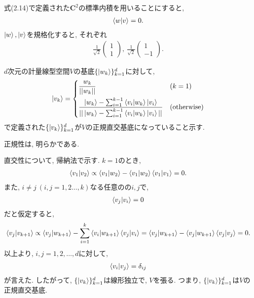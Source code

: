 \begin{ex}
    \label{ex2.7}
    式(2.14)で定義された$\bm{C}^2$の標準内積を用いることにすると,
    \begin{align*}
        \braket{w|v}=0.
    \end{align*}
    $\ket{w},\ket{v}$を規格化すると, それぞれ
    \begin{align*}
        \frac{1}{\sqrt{2}}
        \begin{pmatrix}
            1 \\ 1
        \end{pmatrix}
        ,\
        \frac{1}{\sqrt{2}}
        \begin{pmatrix}
            1 \\ -1
        \end{pmatrix}.
    \end{align*}
\end{ex}

\begin{ex}
    \label{ex2.8}
    $d$次元の計量線型空間$V$の基底$\{\ket{w_k}\}_{k=1}^d$に対して,
    \begin{align*}
        \ket{v_{k}}
        =
        \begin{dcases}
            \frac{w_{k}}{||w_{k}||} & (k=1)                \\
            \frac{
            \ket{w_{k}}-\sum_{i=1}^{k-1}\braket{v_i|w_{k}} \ket{v_i}
            }{
            ||\ket{w_{k}}-\sum_{i=1}^{k-1}\braket{v_i|w_{k}} \ket{v_i}||
            }                       & (\mathrm{otherwise})
        \end{dcases}
    \end{align*}
    で定義された$\{\ket{v_k}\}_{k=1}^d$が$V$の正規直交基底になっていること示す.
    \par
    正規性は, 明らかである.
    \par
    直交性について, 帰納法で示す.
    $k=1$のとき,
    \begin{align*}
        \braket{v_1|v_2}
        \propto
        \braket{v_1|w_2}- \braket{v_1|w_2} \braket{v_1|v_1} = 0.
    \end{align*}
    また, $i \neq j\ (i,j=1,2 \dots, k)$なる任意のの$i,j$で,
    \begin{align*}
        \braket{v_j|v_i} = 0
    \end{align*}
    だと仮定すると,
    \begin{align*}
        \braket{v_j|v_{k+1}}
        \propto
        \braket{v_j|w_{k+1}}-\sum_{i=1}^k\braket{v_i|w_{k+1}} \braket{v_j|v_i}
        =
        \braket{v_j|w_{k+1}}-\braket{v_j|w_{k+1}}\braket{v_j|v_j}
        =
        0.
    \end{align*}
    以上より, $i,j=1,2,\dots,d$に対して,
    \begin{align*}
        \braket{v_i|v_j} = \delta_{ij}
    \end{align*}
    が言えた. したがって, $\{\ket{v_k}\}_{k=1}^d$は線形独立で, $V$を張る. つまり, $\{\ket{v_k}\}_{k=1}^d$は$V$の正規直交基底.
\end{ex}

